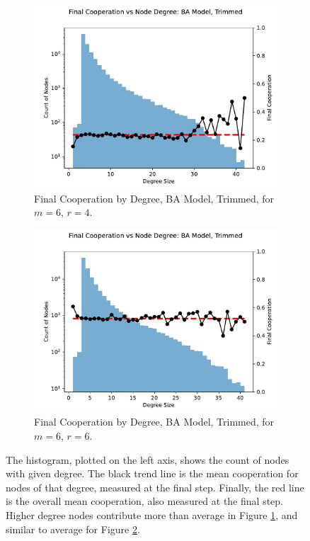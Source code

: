 \FloatBarrier 
\begin{figure}[!h]
  \begin{subfigure}[b]{0.45\textwidth}
    \includegraphics[width=1.1\textwidth]{images/Rep_BA_node_groups_m_6_phi_4_trimmed.pdf}
    \caption{Final Cooperation by Degree, BA Model, Trimmed, for $m=6$, $r=4$.   }
    \label{ID_by_degree_m_6_phi_4}
  \end{subfigure}
  \hfill
  \begin{subfigure}[b]{0.45\textwidth}
    \includegraphics[width=1.1\textwidth]{images/ID_BA_node_groups_m_6_phi_6_trimmed.pdf}
    \caption{Final Cooperation by Degree, BA Model, Trimmed, for $m=6$, $r=6$. }
    \label{ID_by_degree_m_6_phi_6}
  \end{subfigure}
  \caption{The histogram, plotted on the left axis, shows the count of nodes with given degree. The black trend line is the mean cooperation for nodes of that degree, measured at the final step. Finally, the red line is the overall mean cooperation, also measured at the final step. Higher degree nodes contribute more than average in Figure \ref{ID_by_degree_m_6_phi_4}, and similar to average for Figure \ref{ID_by_degree_m_6_phi_6}. } \label{ID_by_degree_m_6}
\end{figure} 
\FloatBarrier


